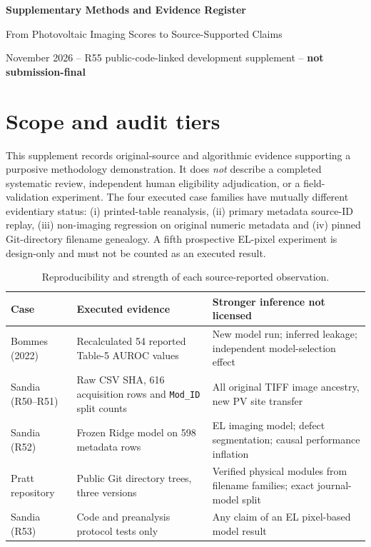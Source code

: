 \documentclass[10pt,a4paper]{article}
\begin{document}
\begin{center}
{\Large \bfseries Supplementary Methods and Evidence Register}\par
\medskip
{\normalsize From Photovoltaic Imaging Scores to Source-Supported Claims}\par
{} November 2026 -- R55 public-code-linked development supplement -- \textbf{not submission-final}
\end{center}
\section{Scope and audit tiers}
This supplement records original-source and algorithmic evidence supporting a purposive methodology demonstration. It does \emph{not} describe a completed systematic review, independent human eligibility adjudication, or a field-validation experiment. The four executed case families have mutually different evidentiary status: (i) printed-table reanalysis, (ii) primary metadata source-ID replay, (iii) non-imaging regression on original numeric metadata and (iv) pinned Git-directory filename genealogy. A fifth prospective EL-pixel experiment is design-only and must not be counted as an executed result.

\begin{table}[ht]\centering\small
\caption{Reproducibility and strength of each source-reported observation.}
\begin{tabularx}{\linewidth}{@{}p{2.5cm}p{2.3cm}X@{}}\toprule
Case & Executed evidence & Stronger inference not licensed \\\midrule
Bommes (2022) & Recalculated 54 reported Table-5 AUROC values & New model run; inferred leakage; independent model-selection effect \\
Sandia (R50--R51) & Raw CSV SHA, 616 acquisition rows and \texttt{Mod\_ID} split counts & All original TIFF image ancestry, new PV site transfer \\
Sandia (R52) & Frozen Ridge model on 598 metadata rows & EL imaging model; defect segmentation; causal performance inflation \\
Pratt repository & Public Git directory trees, three versions & Verified physical modules from filename families; exact journal-model split \\
Sandia (R53) & Code and preanalysis protocol tests only & Any claim of an EL pixel-based model result \\
\bottomrule\end{tabularx}
\end{table}
\end{document}

